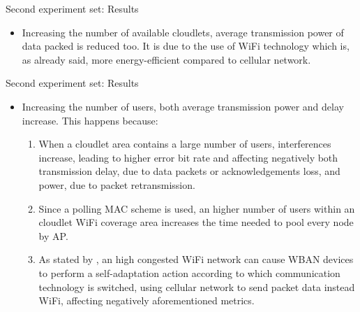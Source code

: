 \documentclass[10pt]{beamer}
\begin{document}
\begin{frame}{Second experiment set: Results} 

\begin{itemize}

\item Increasing the number of available cloudlets, average transmission power of data packed is reduced too. It is due to the use of WiFi technology which is, as already said, more energy-efficient compared to cellular network.

\end{itemize}

\end{frame} 
\begin{frame}{Second experiment set: Results} 

\begin{itemize}

\item Increasing the number of users, both average transmission power and delay increase. This happens because:

\begin{enumerate}
\item When a cloudlet area contains a large number of users, interferences increase, leading to higher error bit rate and affecting negatively both transmission delay, due to data packets or acknowledgements loss, and power, due to packet retransmission.

\item Since a polling MAC scheme is used, an higher number of users within an cloudlet WiFi coverage area increases the time needed to pool every node by AP. 

\item As stated by \citet{MSAReport}, an high congested WiFi network can cause WBAN devices to perform a self-adaptation action according to which communication technology is switched, using cellular network to send packet data instead WiFi, affecting negatively aforementioned metrics.
\end{enumerate}

\end{itemize}

\end{frame} 
\end{document}
